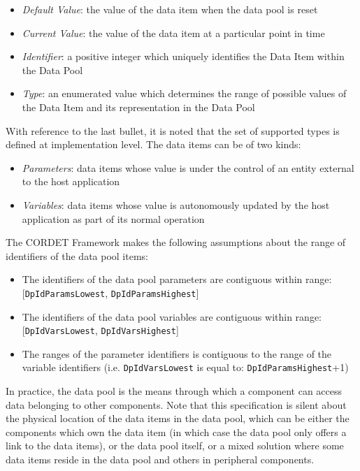 \documentclass{pnp_article}
\begin{document}
\begin{itemize}
\item \textit{Default Value}: the value of the data item when the data pool is reset
\item \textit{Current Value}: the value of the data item at a particular point in time
\item \textit{Identifier}: a positive integer which uniquely identifies the Data Item within the Data Pool
\item \textit{Type}: an enumerated value which determines the range of possible values of the Data Item and its representation in the Data Pool
\end{itemize}

With reference to the last bullet, it is noted that the set of supported types is defined at implementation level. The data items can be of two kinds:

\begin{itemize}
\item \textit{Parameters}: data items whose value is under the control of an entity external to the host application 
\item \textit{Variables}: data items whose value is autonomously updated by the host application as part of its normal operation
\end{itemize}

The CORDET Framework makes the following assumptions about the range of identifiers of the data pool items:

\begin{itemize}
\item The identifiers of the data pool parameters are contiguous within range: [\texttt{DpIdParamsLowest}, \texttt{DpIdParamsHighest}]
\item The identifiers of the data pool variables are contiguous within range: [\texttt{DpIdVarsLowest}, \texttt{DpIdVarsHighest}]
\item The ranges of the parameter identifiers is contiguous to the range of the variable identifiers (i.e. \texttt{DpIdVarsLowest} is equal to: \texttt{DpIdParamsHighest}+1)
\end{itemize}

In practice, the data pool is the means through which a component can access data belonging to other components. Note that this specification is silent about the physical location of the data items in the data pool, which can be either the components which own the data item (in which case the data pool only offers a link to the data items), or the data pool itself, or a mixed solution where some data items reside in the data pool and others in peripheral components. 
\end{document}
